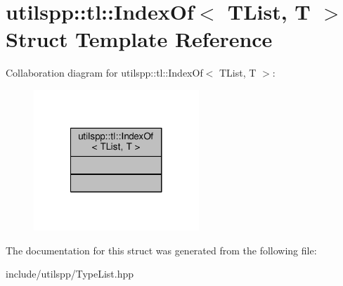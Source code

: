 \hypertarget{structutilspp_1_1tl_1_1IndexOf}{\section{utilspp\-:\-:tl\-:\-:Index\-Of$<$ T\-List, T $>$ Struct Template Reference}
\label{structutilspp_1_1tl_1_1IndexOf}
}


Collaboration diagram for utilspp\-:\-:tl\-:\-:Index\-Of$<$ T\-List, T $>$\-:
\nopagebreak
\begin{figure}[H]
\begin{center}
\leavevmode
\includegraphics[width=176pt]{structutilspp_1_1tl_1_1IndexOf__coll__graph}
\end{center}
\end{figure}


The documentation for this struct was generated from the following file\-:\begin{DoxyCompactItemize}
\item 
include/utilspp/Type\-List.\-hpp\end{DoxyCompactItemize}
